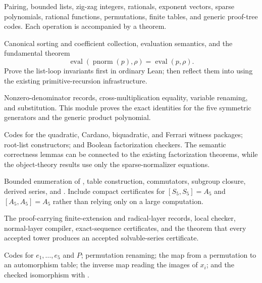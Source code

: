 \begin{description}[style=nextline]
\item[\code{Codes.lean}]
Pairing, bounded lists, zig-zag integers, rationals, exponent vectors, sparse
polynomials, rational functions, permutations, finite tables, and generic
proof-tree codes.  Each operation is accompanied by a  theorem.

\item[\code{SparsePolynomial.lean}]
Canonical sorting and coefficient collection, evaluation semantics, and the
fundamental theorem
\[
 \operatorname{eval}(\operatorname{pnorm}(p),\rho)
 =\operatorname{eval}(p,\rho).
\]
Prove the list-loop invariants first in ordinary Lean; then reflect them into
 using the existing primitive-recursion infrastructure.

\item[\code{RationalFunction.lean}]
Nonzero-denominator records, cross-multiplication equality, variable renaming,
and substitution.  This module proves the exact identities for the five
symmetric generators and the generic product polynomial.

\item[\code{LowDegreeCertificates.lean}]
Codes for the quadratic, Cardano, biquadratic, and Ferrari witness packages;
root-list constructors; and Boolean factorization checkers.  The semantic
correctness lemmas can be connected to the existing factorization theorems,
while the object-theory results use only the sparse-normalizer equations.

\item[\code{FinitePermutationGroups.lean}]
Bounded enumeration of , table construction,
commutators, subgroup closure, derived series, and
.  Include compact certificates for
$[S_5,S_5]=A_5$ and $[A_5,A_5]=A_5$ rather than relying only on a large
 computation.

\item[\code{RadicalTowerCertificate.lean}]
The proof-carrying finite-extension and radical-layer records, local checker,
normal-layer compiler, exact-sequence certificates, and the theorem that every
accepted tower produces an accepted solvable-series certificate.

\item[\code{GenericQuinticCertificate.lean}]
Codes for $e_1,\ldots,e_5$ and $P$; permutation renaming; the map from a
permutation to an automorphism table; the inverse map reading the images of
$x_i$; and the checked isomorphism with .


\end{description}
